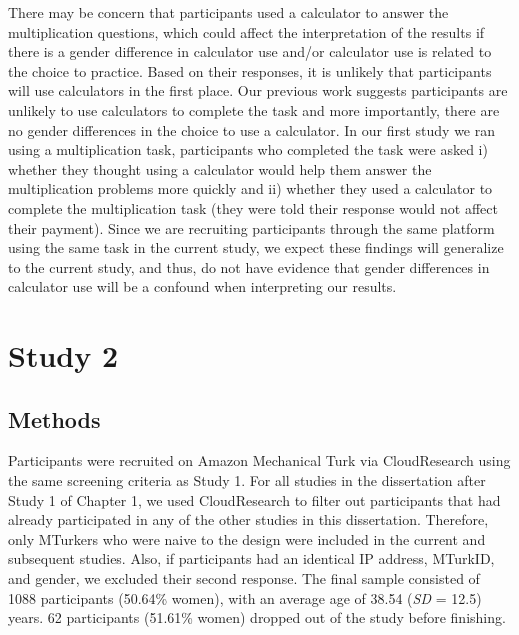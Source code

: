 \documentclass[a4paper,nobind]{templates/ociamthesis}
\begin{document}
There may be concern that participants used a calculator to answer the multiplication questions, which could affect the interpretation of the results if there is a gender difference in calculator use and/or calculator use is related to the choice to practice. Based on their responses, it is unlikely that participants will use calculators in the first place. Our previous work suggests participants are unlikely to use calculators to complete the task and more importantly, there are no gender differences in the choice to use a calculator. In our first study we ran using a multiplication task, participants who completed the task were asked i) whether they thought using a calculator would help them answer the multiplication problems more quickly and ii) whether they used a calculator to complete the multiplication task (they were told their response would not affect their payment). Since we are recruiting participants through the same platform using the same task in the current study, we expect these findings will generalize to the current study, and thus, do not have evidence that gender differences in calculator use will be a confound when interpreting our results.

\hypertarget{study-2}{%
\section{Study 2}\label{study-2}}

\hypertarget{methods-1}{%
\subsection{Methods}\label{methods-1}}

Participants were recruited on Amazon Mechanical Turk via CloudResearch using the same screening criteria as Study 1. For all studies in the dissertation after Study 1 of Chapter 1, we used CloudResearch to filter out participants that had already participated in any of the other studies in this dissertation. Therefore, only MTurkers who were naive to the design were included in the current and subsequent studies. Also, if participants had an identical IP address, MTurkID, and gender, we excluded their second response. The final sample consisted of 1088 participants (50.64\% women), with an average age of 38.54 (\emph{SD} = 12.5) years. 62 participants (51.61\% women) dropped out of the study before finishing.
\end{document}
